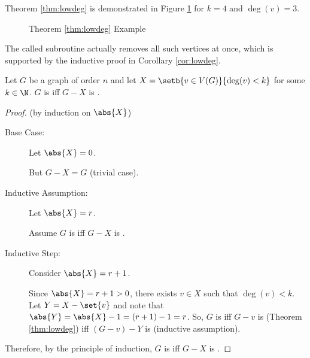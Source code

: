 Theorem \ref{thm:lowdeg} is demonstrated in Figure \ref{fig:lowdeg} for \(k=4\) and \(\deg(v)=3\).

\begin{figure}[h]
  \label{fig:lowdeg}
  \begin{center}
  \end{center}
  \caption{Theorem \ref{thm:lowdeg} Example}
\end{figure}

The called subroutine actually removes all such vertices at once, which is supported by the inductive proof in
Corollary \ref{cor:lowdeg}.

\begin{corollary}
  \label{cor:lowdeg}
  Let \(G\) be a graph of order \(n\) and let \(X=\setb{v\in V(G)}{\deg(v)<k}\) for some \(k\in\N\).  \(G\) is
   iff \(G-X\) is .
\end{corollary}

\begin{proof}
  (by induction on \(\abs{X}\))
  \begin{description}
  \item[Base Case:] Let \(\abs{X}=0\).

    But \(G-X=G\) (trivial case).

  \item[Inductive Assumption:] Let \(\abs{X}=r\).

    Assume \(G\) is  iff \(G-X\) is .

  \item[Inductive Step:] Consider \(\abs{X}=r+1\).
    
    Since \(\abs{X}=r+1>0\), there exists \(v\in X\) such that \(\deg(v)<k\).  Let \(Y=X-\set{v}\) and note that
    \(\abs{Y}=\abs{X}-1=(r+1)-1=r\).  So, \(G\) is  iff \(G-v\) is  (Theorem
    \ref{thm:lowdeg}) iff \((G-v)-Y\) is  (inductive assumption).
  \end{description}

  Therefore, by the principle of induction, \(G\) is  iff \(G-X\) is .
\end{proof}

